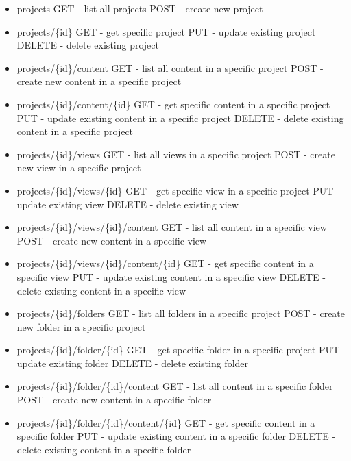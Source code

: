 \documentclass[a4paper,12pt]{article}
\begin{document}
\begin{itemize}
  \item projects
      \subitem GET - list all projects
      \subitem POST - create new project
  \item projects/\{id\}
      \subitem GET - get specific project
      \subitem PUT - update existing project
      \subitem DELETE - delete existing project
  \item projects/\{id\}/content
      \subitem GET - list all content in a specific project
      \subitem POST - create new content in a specific project 
  \item projects/\{id\}/content/\{id\}
      \subitem GET - get specific content in a specific project
      \subitem PUT - update existing content in a specific project
      \subitem DELETE - delete existing content in a specific project

  \item projects/\{id\}/views
      \subitem GET - list all views in a specific project
      \subitem POST - create new view in a specific project 
  \item projects/\{id\}/views/\{id\}
      \subitem GET - get specific view in a specific project
      \subitem PUT - update existing view
      \subitem DELETE - delete existing view
  \item projects/\{id\}/views/\{id\}/content
      \subitem GET - list all content in a specific view
      \subitem POST - create new content in a specific view 
  \item projects/\{id\}/views/\{id\}/content/\{id\}
      \subitem GET - get specific content in a specific view
      \subitem PUT - update existing content in a specific view
      \subitem DELETE - delete existing content in a specific view

  \item projects/\{id\}/folders
      \subitem GET - list all folders in a specific project
      \subitem POST - create new folder in a specific project 
  \item projects/\{id\}/folder/\{id\}
      \subitem GET - get specific folder in a specific project
      \subitem PUT - update existing folder
      \subitem DELETE - delete existing folder
  \item projects/\{id\}/folder/\{id\}/content
      \subitem GET - list all content in a specific folder
      \subitem POST - create new content in a specific folder 
  \item projects/\{id\}/folder/\{id\}/content/\{id\}
      \subitem GET - get specific content in a specific folder
      \subitem PUT - update existing content in a specific folder
      \subitem DELETE - delete existing content in a specific folder
\end{itemize}
\end{document}
